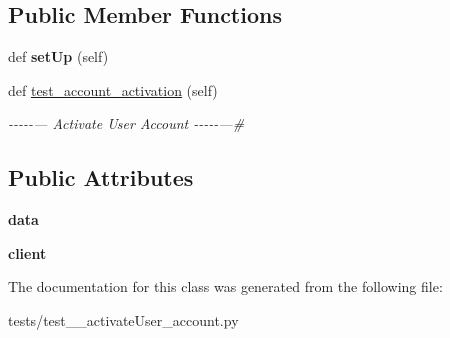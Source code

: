 \subsection*{Public Member Functions}
\begin{DoxyCompactItemize}
\item 
\mbox{\label{classtests_1_1test__4__activate_user__account_1_1_test_user_routes_af48d28913825c6a248189c68625f7caa}} 
def {\bfseries set\+Up} (self)
\item 
\mbox{\label{classtests_1_1test__4__activate_user__account_1_1_test_user_routes_a5289a654fbeb437cad124ef2675168d0}} 
def \hyperlink{classtests_1_1test__4__activate_user__account_1_1_test_user_routes_a5289a654fbeb437cad124ef2675168d0}{test\+\_\+account\+\_\+activation} (self)
\begin{DoxyCompactList}\small\item\em -\/-\/-\/-\/-\/--- Activate User Account -\/-\/-\/-\/-\/---\# \end{DoxyCompactList}\end{DoxyCompactItemize}
\subsection*{Public Attributes}
\begin{DoxyCompactItemize}
\item 
\mbox{\label{classtests_1_1test__4__activate_user__account_1_1_test_user_routes_a39862400e777d1b2c27702ac0140b9e2}} 
{\bfseries data}
\item 
\mbox{\label{classtests_1_1test__4__activate_user__account_1_1_test_user_routes_a534b042d6f8a99678882361391e75d19}} 
{\bfseries client}
\end{DoxyCompactItemize}


The documentation for this class was generated from the following file\+:\begin{DoxyCompactItemize}
\item 
tests/test\+\_\+\_\+activate\+User\+\_\+account.\+py\end{DoxyCompactItemize}
